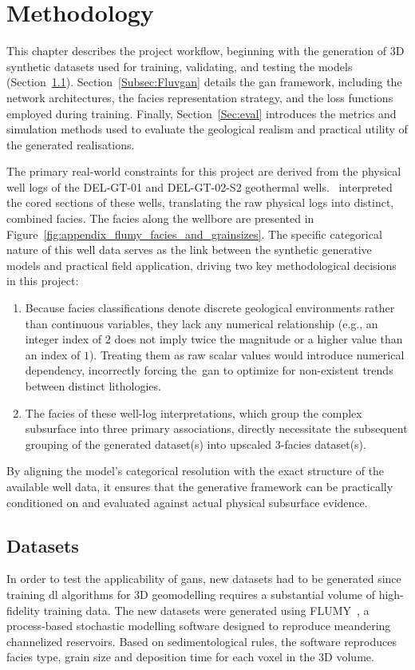 \chapter{Methodology}\label{Ch:Methodology}
This chapter describes the project workflow, beginning with the generation of 3D synthetic datasets used for training, validating, and testing the models (Section~\ref{sec:data_gen}). Section~\ref{Subsec:Fluvgan} details the \gls{gan} framework, including the network architectures, the facies representation strategy, and the loss functions employed during training. Finally, Section~\ref{Sec:eval} introduces the metrics and simulation methods used to evaluate the geological realism and practical utility of the generated realisations.

The primary real-world constraints for this project are derived from the physical well logs of the DEL-GT-01 and DEL-GT-02-S2 geothermal wells.~\textcite{bruining2023sedimentological} interpreted the cored sections of these wells, translating the raw physical logs into distinct, combined facies. The facies along the wellbore are presented in Figure~\ref{fig:appendix_flumy_facies_and_grainsizes}. The specific categorical nature of this well data serves as the link between the synthetic generative models and practical field application, driving two key methodological decisions in this project:
\begin{enumerate}
    \item Because facies classifications denote discrete geological environments rather than continuous variables, they lack any numerical relationship (e.g., an integer index of $2$ does not imply twice the magnitude or a higher value than an index of $1$). Treating them as raw scalar values would introduce numerical dependency, incorrectly forcing the~\gls{gan} to optimize for non-existent trends between distinct lithologies.
    \item The facies of these well-log interpretations, which group the complex subsurface into three primary associations, directly necessitate the subsequent grouping of the generated dataset(s) into upscaled 3-facies dataset(s).
\end{enumerate}
 By aligning the model's categorical resolution with the exact structure of the available well data, it ensures that the generative framework can be practically conditioned on and evaluated against actual physical subsurface evidence.
\section{Datasets}\label{sec:data_gen}
In order to test the applicability of \glspl{gan}, new datasets had to be generated since training \gls{dl} algorithms for 3D geomodelling requires a substantial volume of high-fidelity training data. The new datasets were generated using FLUMY~\parencite{martin-hal-01313232}, a process-based stochastic modelling software designed to reproduce meandering channelized reservoirs. Based on sedimentological rules, the software reproduces facies type, grain size and deposition time for each voxel in the 3D volume.
